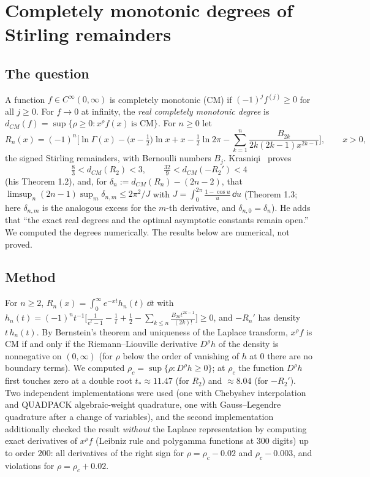 \section{Completely monotonic degrees of Stirling remainders}\label{sec:stirling}

\subsection{The question}
A function $f\in C^\infty(0,\infty)$ is completely monotonic (CM) if $(-1)^jf^{(j)}\ge0$ for all $j\ge0$. For $f\to0$ at infinity, the \emph{real completely monotonic degree} is $d_{CM}(f)=\sup\{\rho\ge0: x^\rho f(x)\ \text{is CM}\}$. For $n\ge0$ let
\[
R_n(x)=(-1)^n\Big[\ln\Gamma(x)-\big(x-\tfrac12\big)\ln x+x-\tfrac12\ln2\pi-\sum_{k=1}^n\frac{B_{2k}}{2k(2k-1)x^{2k-1}}\Big],\qquad x>0,
\]
the signed Stirling remainders, with Bernoulli numbers $B_j$. Krasniqi~\cite{Kr} proves
\[
\tfrac83<d_{CM}(R_2)<3,\qquad \tfrac{32}9<d_{CM}(-R_2')<4
\]
(his Theorem 1.2), and, for $\delta_{n}:=d_{CM}(R_n)-(2n-2)$, that $\limsup_n(2n-1)\sup_m\delta_{n,m}\le 2\pi^2/J$ with $J=\int_0^{2\pi}\frac{1-\cos u}u\,\dd u$ (Theorem 1.3; here $\delta_{n,m}$ is the analogous excess for the $m$-th derivative, and $\delta_{n,0}=\delta_n$). He adds that ``the exact real degrees and the optimal asymptotic constants remain open.'' We computed the degrees numerically. The results below are numerical, not proved.

\subsection{Method}
For $n\ge2$, $R_n(x)=\int_0^\infty e^{-xt}h_n(t)\,\dd t$ with $h_n(t)=(-1)^nt^{-1}\big[\frac1{e^t-1}-\frac1t+\frac12-\sum_{k\le n}\frac{B_{2k}t^{2k-1}}{(2k)!}\big]\ge0$, and $-R_n'$ has density $t\,h_n(t)$. By Bernstein's theorem and uniqueness of the Laplace transform, $x^\rho f$ is CM if and only if the Riemann--Liouville derivative $D^\rho h$ of the density is nonnegative on $(0,\infty)$ (for $\rho$ below the order of vanishing of $h$ at $0$ there are no boundary terms). We computed $\rho_c=\sup\{\rho: D^\rho h\ge0\}$; at $\rho_c$ the function $D^\rho h$ first touches zero at a double root $t_*\approx11.47$ (for $R_2$) and $\approx8.04$ (for $-R_2'$). Two independent implementations were used (one with Chebyshev interpolation and QUADPACK algebraic-weight quadrature, one with Gauss--Legendre quadrature after a change of variables), and the second implementation additionally checked the result \emph{without} the Laplace representation by computing exact derivatives of $x^\rho f$ (Leibniz rule and polygamma functions at 300 digits) up to order $200$: all derivatives of the right sign for $\rho=\rho_c-0.02$ and $\rho_c-0.003$, and violations for $\rho=\rho_c+0.02$.

